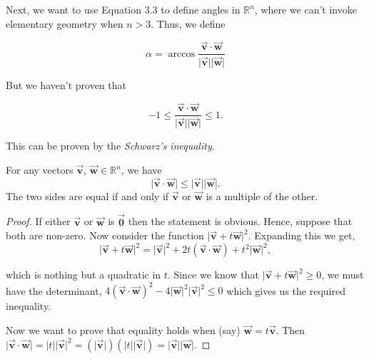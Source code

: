 \documentclass[12pt]{article}
\theoremstyle{remark}
\let\oldvec = \vec
\renewcommand{\vec}[1]{\oldvec{\mathbf{#1}}}
\numberwithin{equation}{section}
\begin{document}

Next, we want to use Equation 3.3 to define angles in $ \mathbb{R}^n $, where we can't invoke elementary geometry when $ n > 3 $. Thus, we define 

\begin{equation}
	\alpha = \arccos{\frac{\vec{v} \cdot \vec{w}}{\lvert \vec{v} \rvert\lvert \vec{w} \rvert}}
\end{equation}

But we haven't proven that 

\begin{equation}
   -1 \leq \frac{\vec{v} \cdot \vec{w}}{\lvert \vec{v} \rvert\lvert \vec{w} \rvert} \leq 1. 
\end{equation}


This can be proven by the \textit{Schwarz's inequality}.

\begin{important}
	For any vectors $ \vec{v} $, $ \vec{w} \in \mathbb{R}^n $, we have
	\begin{equation}
	    \lvert \vec{v} \cdot \vec{w} \rvert \leq \lvert \vec{v} \rvert \lvert \vec{w} \rvert. 
	\end{equation}
	The two sides are equal if and only if $ \vec{v} $ or $ \vec{w} $ is a multiple of the other. 
\end{important}
 
\begin{proof}
   If either $ \vec{v} $ or $ \vec{w} $ is $ \vec{0} $ then the statement is obvious. Hence, suppose that both are non-zero. Now consider the function $ \lvert \vec{v} + t \vec{w} \rvert^2 $. Expanding this we get,
   \begin{equation}
       \lvert \vec{v} + t \vec{w} \rvert^2 = \lvert \vec{v} \rvert^2 + 2t (\vec{v} \cdot \vec{w}) + t^2 \lvert \vec{w} \rvert^2,
   \end{equation}

   which is nothing but a quadratic in $ t $. Since we know that $ \lvert \vec{v} + t \vec{w} \rvert^2 \geq 0 $, we must have the determinant, $ 4(\vec{v} \cdot \vec{w})^2 - 4 \lvert \vec{w} \rvert^2 \lvert \vec{v} \rvert^2 \leq 0 $ which gives us the required inequality. \par
   Now we want to prove that equality holds when (say) $ \vec{w} = t \vec{v} $. Then %
   $ \lvert \vec{v} \cdot \vec{w} \rvert = \lvert t \rvert \lvert \vec{v} \rvert^2 = (\lvert \vec{v} \rvert)(\lvert t \rvert \lvert \vec{v} \rvert ) = \lvert \vec{v} \rvert\lvert \vec{w} \rvert $. 
\end{proof}
\end{document}
